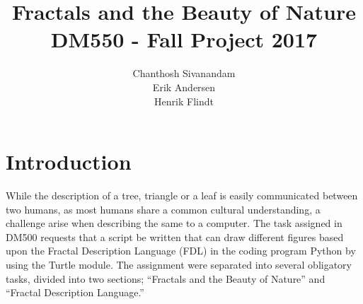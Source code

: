 \documentclass[titlepage]{article}
\author{Chanthosh Sivanandam \\ Erik Andersen \\ Henrik Flindt }
\title{Fractals and the Beauty of Nature \\ DM550 - Fall Project 2017}
\begin{document}
\maketitle
\section{Introduction}
While the description of a tree, triangle or a leaf is easily communicated between two humans, as most humans share a common cultural understanding, a challenge arise when describing the same to a computer. The task assigned in DM500 requests that a script be written that can draw different figures based upon the Fractal Description Language (FDL) in the coding program Python by using the Turtle module. The assignment were separated into several obligatory tasks, divided into two sections; “Fractals and the Beauty of Nature” and “Fractal Description Language.”
\end{document}
